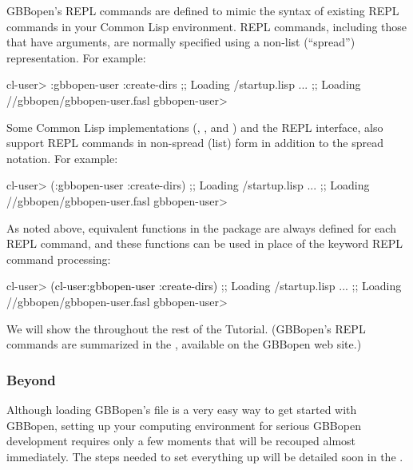 \documentclass[10pt,twoside,english,pdftex]{article}
\begin{document}
GBBopen's REPL commands are defined to mimic the syntax of existing REPL
commands in your Common Lisp environment.  REPL commands, including those that
have arguments, are normally specified using a non-list (``spread'')
representation. For example:
%
\W\supp
\begin{example}
  cl-user> :gbbopen-user :create-dirs
  ;; Loading /startup.lisp
     ...
  ;; Loading //gbbopen/gbbopen-user.fasl
  gbbopen-user>
\end{example}
%
Some Common Lisp implementations (,
, and
) and the
 REPL interface, also
support REPL commands in non-spread (list) form in addition to the
spread notation.  For example:
%
\W\supp\notpretop
\begin{example}
  cl-user> (:gbbopen-user :create-dirs)
  ;; Loading /startup.lisp
     ...
  ;; Loading //gbbopen/gbbopen-user.fasl
  gbbopen-user>
\end{example}

As noted above, equivalent functions in the 
package are always defined for each REPL command, and these functions can be
used in place of the keyword REPL command processing:
%
\W\supp
\begin{example}
\textcolor{darkergray}{%
  cl-user> \textcolor{black}{(cl-user:gbbopen-user :create-dirs)}
  ;; Loading /startup.lisp
     ...
  ;; Loading //gbbopen/gbbopen-user.fasl
  gbbopen-user>}
\end{example}

We will show the 
throughout the rest of the Tutorial.  (GBBopen's REPL commands are summarized
in the , available on the
GBBopen web site.)

\subsubsection*{Beyond }

Although loading GBBopen's 
file is a very easy way to get started with GBBopen, setting up your computing
environment for serious GBBopen development requires only a few moments that
will be recouped almost immediately.  The steps needed to set everything up
will be detailed soon in the .
\end{document}
